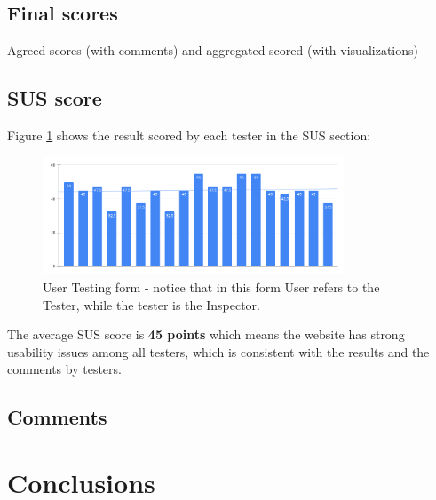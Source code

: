 \subsection{Final scores}
Agreed scores (with comments) and aggregated scored (with visualizations)

\subsection{SUS score}
Figure \ref{fig:sus_result} shows the result scored by each tester in the SUS section:
\begin{figure}[h]
	\centering
	\includegraphics[width=0.8\textwidth]{img/SUS.png}
	\caption{User Testing form - notice that in this form User refers to the Tester, while the tester is the Inspector.}
	\label{fig:sus_result}
\end{figure}
The average SUS score is \textbf{45 points} which means the website has strong usability issues among all testers, which is consistent with the results and the comments by testers.

\subsection{Comments}

\section{Conclusions}
